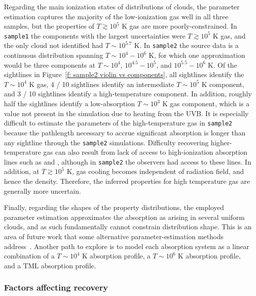 \documentclass[fleqn,usenatbib]{mnras}
\begin{document}
Regarding the main ionization states of distributions of clouds,
the parameter estimation captures the majority of the low-ionization gas well in all three samples, but the properties of $T \gtrsim 10^5$ K gas are more poorly-constrained.
In \texttt{sample1} the components with the largest uncertainties were $T \gtrsim 10^5$ K gas,
and the only cloud not identified had $T \sim 10^{5.7}$ K.
In \texttt{sample2} the source data is a continuous distribution spanning $T \sim 10^4 - 10^6$ K,
for which one approximation would be three components at $T\sim 10^4$, $10^{4.5}-10^5$, and $10^{5.5}-10^6$ K.
Of the sightlines in Figure~\ref{f: sample2 violin vs components}, 
all sightlines identify the $T \sim 10^4$ K gas,
4 / 10 sightlines identify an intermediate $T \sim 10^5$ K component,
and 3 / 10 sightlines identify a high-temperature component.
In addition, roughly half the sightlines identify a low-absorption $T \sim 10^3$ K gas component, which is a value not present in the simulation due to heating from the UVB.
It is especially difficult to estimate the parameters of the high-temperature gas in \texttt{sample2} because the pathlength necessary to accrue significant absorption is longer than any sightline through the \texttt{sample2} simulations.
Difficulty recovering higher-temperature gas can also result from lack of access to high-ionization absorption lines such as  and ,
although in \texttt{sample2} the observers had access to these lines.
In addition, at $T \gtrsim 10^5$ K, gas cooling becomes independent of radiation field, and hence the density. 
Therefore, the inferred properties for high temperature gas are generally more uncertain.

Finally, regarding the shapes of the property distributions,
the employed parameter estimation approximates the absorption as arising in several uniform clouds,
and as such fundamentally cannot constrain distribution shape.
This is an area of future work that some alternative parameter-estimation methods address~\citep[such as fitting the underlying density distribution as a power law;][]{stern2016Universal}.
Another path to explore is to model each absorption system as a linear combination of a $T \sim 10^4$ K absorption profile, a $T \sim 10^6$ K absorption profile, and a TML absorption profile.

\subsubsection{Factors affecting recovery}
\label{s: discussion -- cloud structure -- factors}
\end{document}
